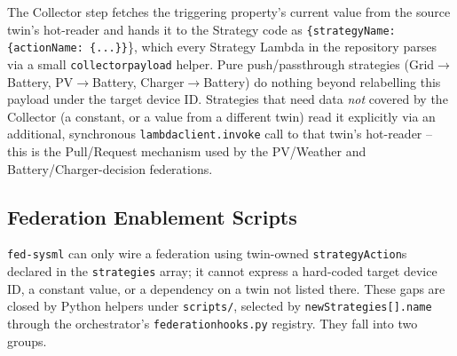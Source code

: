 \documentclass[11pt]{article}
\renewcommand{\_}{\textunderscore\allowbreak}
\begin{document}
The Collector step fetches the triggering property's current value from the
source twin's hot-reader and hands it to the Strategy code as
\texttt{\{strategyName: \{actionName: \{...\}\}}\}, which every Strategy
Lambda in the repository parses via a small \texttt{\_collector\_payload}
helper. Pure push/passthrough strategies (Grid$\rightarrow$Battery,
PV$\rightarrow$Battery, Charger$\rightarrow$Battery) do nothing beyond
relabelling this payload under the target device ID. Strategies that need
data \emph{not} covered by the Collector (a constant, or a value from a
different twin) read it explicitly via an additional, synchronous
\texttt{lambda\_client.invoke} call to that twin's hot-reader -- this is the
Pull/Request mechanism used by the PV/Weather and Battery/Charger-decision
federations.

\subsection{Federation Enablement Scripts}

\texttt{fed-sysml} can only wire a federation using twin-owned
\texttt{strategyAction}s declared in the \texttt{strategies} array; it cannot
express a hard-coded target device ID, a constant value, or a dependency on
a twin not listed there. These gaps are closed by Python helpers under
\texttt{scripts/}, selected by \texttt{newStrategies[].name} through the
orchestrator's \texttt{federation\_hooks.py} registry. They fall into two groups.
\end{document}
